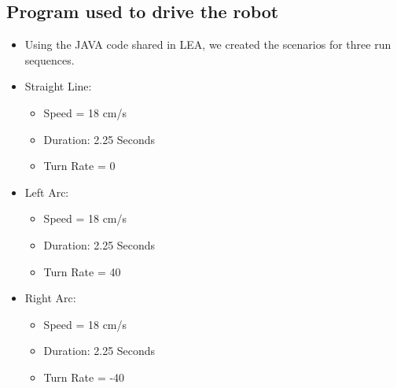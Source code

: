 \documentclass[10pt,a4paper]{article}
\begin{document}
				\subsection{Program used to drive the robot}
					\begin{itemize}
						\item Using the JAVA code shared in LEA, we created the scenarios for three run sequences.
						\item Straight Line:
							\begin{itemize}
								\item Speed = 18 cm/s
								\item Duration: 2.25 Seconds
								\item Turn Rate = 0
							\end{itemize}
						\item Left Arc:
							\begin{itemize}
								\item Speed = 18 cm/s
								\item Duration: 2.25 Seconds
								\item Turn Rate = 40
							\end{itemize}
						\item Right Arc:
							\begin{itemize}
								\item Speed = 18 cm/s
								\item Duration: 2.25 Seconds
								\item Turn Rate = -40
							\end{itemize}							
					\end{itemize}
\end{document}
